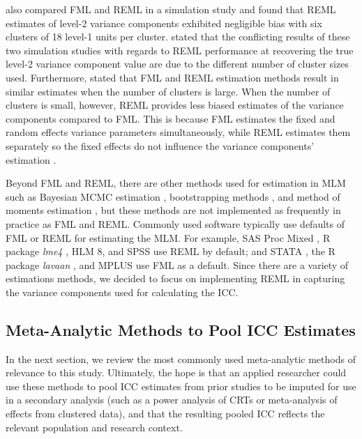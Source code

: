  also compared FML and REML in a simulation study and found that REML estimates of level-2 variance components exhibited negligible bias with six clusters of 18 level-1 units per cluster.  stated that the conflicting results of these two simulation studies with regards to REML performance at recovering the true level-2 variance component value are due to the different number of cluster sizes used. Furthermore,  stated that FML and REML estimation methods result in similar estimates when the number of clusters is large. When the number of clusters is small, however, REML provides less biased estimates of the variance components compared to FML. This is because FML estimates the fixed and random effects variance parameters simultaneously, while REML estimates them separately so the fixed effects do not influence the variance components' estimation \cite{mcneish2016, raudenbushHierarchicalLinearModels2002, searle2009variance}. 

Beyond FML and REML, there are other methods used for estimation in MLM such as Bayesian MCMC estimation \cite{mcneish2016}, bootstrapping methods \cite{huang2016alternatives, dedrick2009, maas2005, mcneish2016}, and method of moments estimation \cite{hedbergReferenceValuesWithinDistrict2014}, but these methods are not implemented as frequently in practice as FML and REML. Commonly used software typically use defaults of FML or REML for estimating the MLM. For example, SAS Proc Mixed \cite{manthena}, R package \emph{lme4} \cite{bates2015}, HLM 8\cite{raudenbush2019}, and SPSS \cite{spss} use REML by default; and STATA \cite{dsginideco1}, the R package \emph{lavaan} \cite{rosseel2012}, and MPLUS \cite{lk2020muthen} use FML as a default. Since there are a variety of estimations methods, we decided to focus on implementing REML in capturing the variance components used for calculating the ICC. 

\subsection{Meta-Analytic Methods to Pool ICC Estimates}
In the next section, we review the most commonly used meta-analytic methods of relevance to this study. Ultimately, the hope is that an applied researcher could use these methods to pool ICC estimates from prior studies to be imputed for use in a secondary analysis (such as a power analysis of CRTs or meta-analysis of effects from clustered data), and that the resulting pooled ICC reflects the relevant population and research context.

